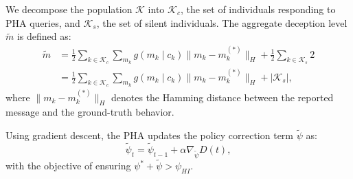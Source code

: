 \documentclass[sigconf,review]{acmart}
\newcommand{\abs}[1]{\left| #1 \right|}
\begin{document}
We decompose the population $\mathcal{K}$ into $\mathcal{K}_c$, the set of individuals responding to PHA queries, and $\mathcal{K}_s$, the set of silent individuals. The aggregate deception level $\tilde{m}$ is defined as:
\begin{equation}
\begin{aligned}
    \tilde{m} &= \frac{1}{2}\sum\limits_{k\in \mathcal{K}_c}\sum\limits_{m_k} g(m_k\mid c_k) \lVert m_k-m_k^{(\ast)} \rVert_H + \frac{1}{2}\sum\limits_{k\in \mathcal{K}_s} 2 \\ 
              &= \frac{1}{2}\sum\limits_{k\in \mathcal{K}_c}\sum\limits_{m_k} g(m_k\mid c_k) \lVert m_k-m_k^{(\ast)} \rVert_H + \abs{\mathcal{K}_s},
\end{aligned}
\end{equation}
where $\lVert m_k - m_k^{(\ast)} \rVert_H$ denotes the Hamming distance between the reported message and the ground-truth behavior.

Using gradient descent, the PHA updates the policy correction term $\tilde{\psi}$ as:
\begin{equation}
\tilde{\psi}_t = \tilde{\psi}_{t-1} + \alpha \nabla_{\tilde{\psi}} D(t),
\end{equation}
with the objective of ensuring $\psi^{\ast} + \tilde{\psi} > \psi_{HI}$.




\end{document}
